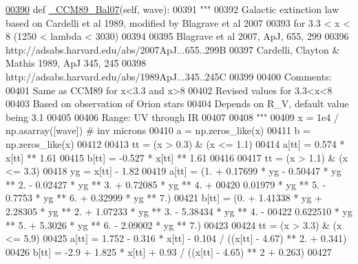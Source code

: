 \begin{DoxyVerb}
\begin{DoxyCode}
\hypertarget{classpyneb_1_1extinction_1_1red__corr_1_1_red_corr_l00390}{}\hyperlink{classpyneb_1_1extinction_1_1red__corr_1_1_red_corr_a919503a9ebc8aafcf92ea819bcc3265c}{00390}     \textcolor{keyword}{def }\hyperlink{classpyneb_1_1extinction_1_1red__corr_1_1_red_corr_a919503a9ebc8aafcf92ea819bcc3265c}{\_CCM89\_Bal07}(self, wave):
00391         \textcolor{stringliteral}{"""}
00392 \textcolor{stringliteral}{        Galactic extinction law based on Cardelli et al 1989, modified by Blagrave et al 2007 }
00393 \textcolor{stringliteral}{        for 3.3 < x < 8 (1250 < lambda < 3030)}
00394 \textcolor{stringliteral}{        }
00395 \textcolor{stringliteral}{        Blagrave et al 2007, ApJ, 655, 299 }
00396 \textcolor{stringliteral}{        http://adsabs.harvard.edu/abs/2007ApJ...655..299B}
00397 \textcolor{stringliteral}{        Cardelli, Clayton & Mathis 1989, ApJ 345, 245}
00398 \textcolor{stringliteral}{        http://adsabs.harvard.edu/abs/1989ApJ...345..245C}
00399 \textcolor{stringliteral}{}
00400 \textcolor{stringliteral}{        Comments:}
00401 \textcolor{stringliteral}{        Same as CCM89 for x<3.3 and x>8}
00402 \textcolor{stringliteral}{        Revised values for 3.3<x<8}
00403 \textcolor{stringliteral}{        Based on observation of Orion stars}
00404 \textcolor{stringliteral}{        Depends on R\_V, default value being 3.1}
00405 \textcolor{stringliteral}{}
00406 \textcolor{stringliteral}{        Range: UV through IR}
00407 \textcolor{stringliteral}{        }
00408 \textcolor{stringliteral}{        """}
00409         x = 1e4 / np.asarray([wave]) \textcolor{comment}{# inv microns}
00410         a = np.zeros\_like(x)
00411         b = np.zeros\_like(x)
00412         
00413         tt = (x > 0.3) & (x <= 1.1)
00414         a[tt] = 0.574 * x[tt] ** 1.61 
00415         b[tt] = -0.527 * x[tt] ** 1.61
00416     
00417         tt = (x > 1.1) & (x <= 3.3)
00418         yg = x[tt] - 1.82
00419         a[tt] = (1. + 0.17699 * yg - 0.50447 * yg ** 2. - 0.02427 * yg ** 3. + 0.72085 * yg ** 4. + 
00420                  0.01979 * yg ** 5. - 0.7753 * yg ** 6. + 0.32999 * yg ** 7.)
00421         b[tt] = (0. + 1.41338 * yg + 2.28305 * yg ** 2. + 1.07233 * yg ** 3. - 5.38434 * yg ** 4. - 
00422                  0.622510 * yg ** 5. + 5.3026 * yg ** 6. - 2.09002 * yg ** 7.)
00423         
00424         tt = (x > 3.3) & (x <= 5.9)
00425         a[tt] = 1.752 - 0.316 * x[tt] - 0.104 / ((x[tt] - 4.67) ** 2. + 0.341)
00426         b[tt] = -2.9 + 1.825 * x[tt] + 0.93 / ((x[tt] - 4.65) ** 2 + 0.263)
00427         

\end{DoxyCode}
\end{DoxyVerb}
